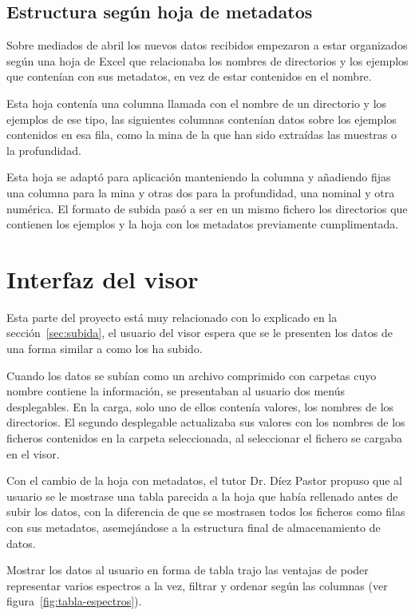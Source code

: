 \subsection{Estructura según hoja de metadatos}\label{sec:excel}

Sobre mediados de abril los nuevos datos recibidos empezaron a estar organizados
según una hoja de Excel que relacionaba los nombres de directorios y los
ejemplos que contenían con sus metadatos, en vez de estar contenidos en el
nombre.

Esta hoja contenía una columna llamada  con el nombre de un directorio y
los ejemplos de ese tipo, las siguientes columnas contenían datos sobre los
ejemplos contenidos en esa fila, como la mina de la que han sido extraídas las
muestras o la profundidad.

Esta hoja se adaptó para aplicación manteniendo la columna  y añadiendo
fijas una columna para la mina y otras dos para la profundidad, una nominal y
otra numérica. El formato de subida pasó a ser en un mismo fichero  los
directorios que contienen los ejemplos y la hoja con los metadatos previamente
cumplimentada.

\section{Interfaz del visor}

Esta parte del proyecto está muy relacionado con lo explicado en la
sección~\ref{sec:subida}, el usuario del visor espera que se le presenten los
datos de una forma similar a como los ha subido.

Cuando los datos se subían como un archivo comprimido con carpetas cuyo nombre
contiene la información, se presentaban al usuario dos menús desplegables. En la
carga, solo uno de ellos contenía valores, los nombres de los directorios. El
segundo desplegable actualizaba sus valores con los nombres de los ficheros
contenidos en la carpeta seleccionada, al seleccionar el fichero se cargaba en
el visor.

Con el cambio de la hoja con metadatos, el tutor Dr. Díez Pastor propuso que al
usuario se le mostrase una tabla parecida a la hoja que había rellenado antes de
subir los datos, con la diferencia de que se mostrasen todos los ficheros como
filas con sus metadatos, asemejándose a la estructura final de almacenamiento de
datos.

Mostrar los datos al usuario en forma de tabla trajo las ventajas de poder
representar varios espectros a la vez, filtrar y ordenar según las columnas (ver
figura~\ref{fig:tabla-espectros}).

